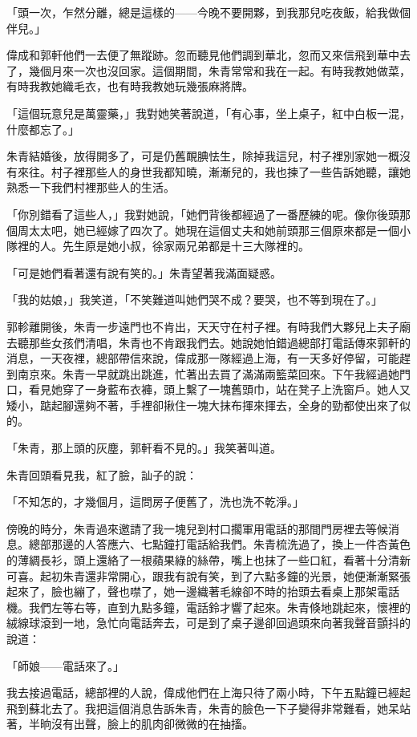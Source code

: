 \documentclass[b5paper,11pt,twoside,twocolumn]{ctexbook}
\begin{document}
「頭一次，乍然分離，總是這樣的——今晚不要開夥，到我那兒吃夜飯，給我做個伴兒。」

偉成和郭軒他們一去便了無蹤跡。忽而聽見他們調到華北，忽而又來信飛到華中去了，幾個月來一次也沒回家。這個期間，朱青常常和我在一起。有時我教她做菜，有時我教她織毛衣，也有時我教她玩幾張麻將牌。

「這個玩意兒是萬靈藥，」我對她笑著說道，「有心事，坐上桌子，紅中白板一混，什麼都忘了。」

朱青結婚後，放得開多了，可是仍舊靦腆怯生，除掉我這兒，村子裡別家她一概沒有來往。村子裡那些人的身世我都知曉，漸漸兒的，我也揀了一些告訴她聽，讓她熟悉一下我們村裡那些人的生活。

「你別錯看了這些人，」我對她說，「她們背後都經過了一番歷練的呢。像你後頭那個周太太吧，她已經嫁了四次了。她現在這個丈夫和她前頭那三個原來都是一個小隊裡的人。先生原是她小叔，徐家兩兄弟都是十三大隊裡的。

「可是她們看著還有說有笑的。」朱青望著我滿面疑惑。

「我的姑娘，」我笑道，「不笑難道叫她們哭不成？要哭，也不等到現在了。」

郭軫離開後，朱青一步遠門也不肯出，天天守在村子裡。有時我們大夥兒上夫子廟去聽那些女孩們清唱，朱青也不肯跟我們去。她說她怕錯過總部打電話傳來郭軒的消息，一天夜裡，總部帶信來說，偉成那一隊經過上海，有一天多好停留，可能趕到南京來。朱青一早就跳出跳進，忙著出去買了滿滿兩籃菜回來。下午我經過她門口，看見她穿了一身藍布衣褲，頭上繫了一塊舊頭巾，站在凳子上洗窗戶。她人又矮小，踮起腳還夠不著，手裡卻揪住一塊大抹布揮來揮去，全身的勁都使出來了似的。

「朱青，那上頭的灰塵，郭軒看不見的。」我笑著叫道。

朱青回頭看見我，紅了臉，訕子的說：

「不知怎的，才幾個月，這問房子便舊了，洗也洗不乾淨。」

傍晚的時分，朱青過來邀請了我一塊兒到村口擱軍用電話的那間門房裡去等候消息。總部那邊的人答應六、七點鐘打電話給我們。朱青梳洗過了，換上一件杏黃色的薄綢長衫，頭上還絡了一根蘋果綠的絲帶，嘴上也抹了一些口紅，看著十分清新可喜。起初朱青還非常開心，跟我有說有笑，到了六點多鐘的光景，她便漸漸緊張起來了，臉也繃了，聲也噤了，她一邊織著毛線卻不時的抬頭去看桌上那架電話機。我們左等右等，直到九點多鐘，電話鈴才響了起來。朱青倏地跳起來，懷裡的絨線球滾到一地，急忙向電話奔去，可是到了桌子邊卻回過頭來向著我聲音顫抖的說道：

「師娘——電話來了。」

我去接過電話，總部裡的人說，偉成他們在上海只待了兩小時，下午五點鐘已經起飛到蘇北去了。我把這個消息告訴朱青，朱青的臉色一下子變得非常難看，她呆站著，半晌沒有出聲，臉上的肌肉卻微微的在抽搐。
\end{document}

